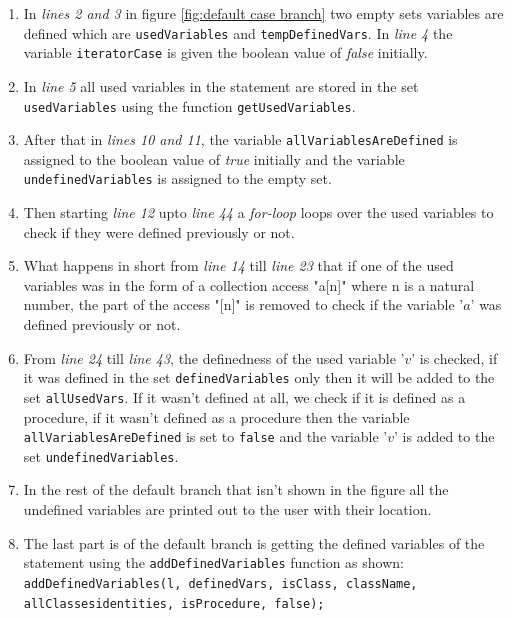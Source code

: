 \documentclass[11pt]{report}
\begin{document}
\begin{enumerate}
\item In \textsl{lines 2 and 3} in figure \ref{fig:default case branch} two empty sets variables are defined which are \texttt{usedVariables} and \texttt{tempDefinedVars}. In \textsl{line 4} the variable \texttt{iteratorCase} is given the boolean value of \textsl{false} initially.

\item In \textsl{line 5} all used variables in the statement are stored in the set \texttt{usedVariables} using the function \texttt{getUsedVariables}.

\item After that in \textsl{lines 10 and 11}, the variable \texttt{allVariablesAreDefined} is assigned to the boolean value of \textsl{true} initially and the variable \texttt{undefinedVariables} is assigned to the empty set.

\item Then starting \textsl{line 12} upto \textsl{line 44} a \textsl{for-loop} loops over the used variables to check if they were defined previously or not.

\item What happens in short from \textsl{line 14} till \textsl{line 23} that if one of the used variables was in the form of a collection access "a[n]" where n is a natural number, the part of the access "[n]" is removed to check if the variable '$a$' was defined previously or not.

\item From \textsl{line 24} till \textsl{line 43}, the definedness of the used variable '$v$' is checked, if it was defined in the set \texttt{definedVariables} only then it will be added to the set \texttt{allUsedVars}. If it wasn't defined at all, we check if it is defined as a procedure, if it wasn't defined as a procedure then the variable \texttt{allVariablesAreDefined} is set to \texttt{false} and the variable '$v$' is added to the set \texttt{undefinedVariables}.

\item In the rest of the default branch that isn't shown in the figure all the undefined variables are printed out to the user with their location.

\item The last part is of the default branch is getting the defined variables of the statement using the \texttt{addDefinedVariables} function as shown:
\\[0.2cm]
\hspace*{0.6cm}
\texttt{addDefinedVariables(l, definedVars, isClass, className,}
\\ 
\hspace*{4.7cm}	
	\texttt{allClassesidentities, isProcedure, false);}
\\
\end{enumerate}
\end{document}
